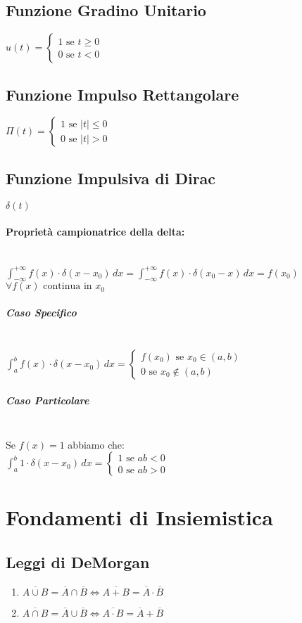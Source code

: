 \documentclass{article}
\begin{document}
\subsection{Funzione Gradino Unitario}
$u(t) = \begin{cases} 1 \text{ se } t \geq 0 \\ 0 \text{ se } t < 0\end{cases}$

\subsection{Funzione Impulso Rettangolare}
$\Pi(t) = \begin{cases} 1 \text{ se } |t| \leq 0 \\ 0 \text{ se } |t| > 0\end{cases}$

\subsection{Funzione Impulsiva di Dirac} 
$\delta(t)$

\paragraph{Proprietà campionatrice della delta:} ~\\
$\int_{- \infty}^{+ \infty} f(x) \cdot \delta(x - x_0) \,dx = \int_{- \infty}^{+ \infty} f(x) \cdot \delta(x_0 - x) \,dx = f(x_0)$  
$\forall f(x) \text{ continua in } x_0$ 
\subparagraph{Caso Specifico} ~\\
$\int_{a}^{b} f(x) \cdot \delta(x - x_0) \,dx = \begin{cases}
f(x_0) \text{ se } x_0 \in (a,b) \\
0 \text{ se } x_0 \notin (a,b)
\end{cases}$
\subparagraph{Caso Particolare} ~\\
Se $f(x) = 1$ abbiamo che: \\
$\int_{a}^{b} 1 \cdot \delta(x - x_0) \,dx = \begin{cases}
1 \text{ se } ab < 0 \\
0 \text{ se } ab > 0
\end{cases}$

\section{Fondamenti di Insiemistica}

\subsection{Leggi di DeMorgan}
\begin{enumerate}
    \item $\overline{A \cup B} = \overline{A} \cap \overline{B} \Leftrightarrow \overline{A + B} = \overline{A} \cdot \overline{B}$
    \item $\overline{A \cap B} = \overline{A} \cup \overline{B} \Leftrightarrow \overline{A \cdot B} = \overline{A} + \overline{B}$
\end{enumerate}
\end{document}
